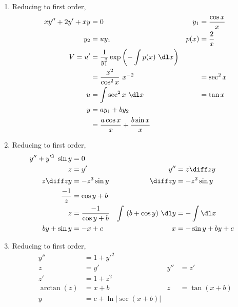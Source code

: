 \begin{enumerate}
    \item Reducing to first order,
          \begin{align}
              xy'' + 2y' + xy & = 0                                                        & y_{1} & = \frac{\cos x}{x} \\
              y_{2}           & = uy_{1}                                                   & p(x)  & = \frac{2}{x}      \\
              V = u'          & = \frac{1}{y_{1}^{2}} \exp\left( -\int p(x)\ \dl x \right)                              \\
                              & = \frac{x^{2}}{\cos ^{2}x}\ x^{-2}                         &       & = \sec ^{2}x       \\
              u               & = \int \sec ^{2}x\ \dl x                                   &       & = \tan x           \\
              y               & = ay_{1} + by_{2}                                                                       \\
                              & = \frac{a\cos x}{x} + \frac{b\sin x}{x}
          \end{align}

    \item Reducing to first order,
          \begin{align}
              y'' + y'^{3}\ \sin y & = 0                                                                    \\
              z                    & = y'                   & y''                       & = z \diff zy      \\
              z\diff zy            & = -z^{3}\sin y         & \diff zy                  & = -z^{2}\sin y    \\
              \frac{-1}{z}         & = \cos y + b                                                           \\
              z                    & =\frac{-1}{\cos y + b} & \int\ (b + \cos y)\ \dl y & = -\int \dl x     \\
              by + \sin y          & = -x +c                & x                         & = -\sin y +by + c
          \end{align}

    \item Reducing to first order,
          \begin{align}
              y''        & = 1 + y'^{2}                                   \\
              z          & = y'                     & y'' & = z'          \\
              z'         & = 1 + z^{2}                                    \\
              \arctan(z) & = x + b                  & z   & = \tan(x + b) \\
              y          & = c + \ln |\sec (x + b)|
          \end{align}


\end{enumerate}
